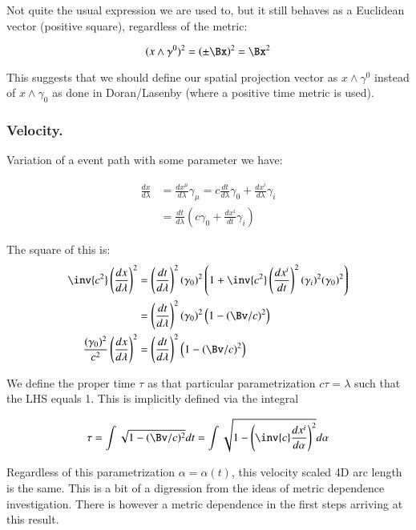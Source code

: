 Not quite the usual expression we are used to, but it still behaves as a Euclidean vector (positive square), regardless of the metric:

\begin{equation*}
(x \wedge \gamma^0)^2 = \left(\pm \Bx\right)^2 = \Bx^2
\end{equation*}

This suggests that we should define our spatial projection vector as $x \wedge \gamma^0$ instead of $x \wedge \gamma_0$ as done in
Doran/Lasenby (where a positive time metric is used).

\subsubsection{Velocity. }

Variation of a event path with some parameter we have:

\begin{align*}
\frac{ d x }{ d \lambda }
&= \frac{ d x^{\mu} }{ d \lambda } \gamma_{\mu} = c \frac{dt}{d\lambda} \gamma_0 + \frac{d x^i }{d\lambda} \gamma_i \\
&= \frac{d t}{d \lambda} \left( c \gamma_0 + \frac{d x^i }{dt} \gamma_i \right)
\end{align*}

The square of this is:
\begin{align*}
\inv{c^2} \left(\frac{ d x }{ d \lambda } \right)^2
&= \left(\frac{dt }{d\lambda}\right)^2 (\gamma_0)^2 \left( 1 + \inv{c^2}\left(\frac{d x^i }{dt}\right)^2 (\gamma_i)^2 (\gamma_0)^2 \right) \\
&= \left(\frac{d t}{d \lambda}\right)^2 (\gamma_0)^2 \left( 1 - (\Bv/c)^2 \right) \\
\frac{ (\gamma_0)^2 }{c^2} \left(\frac{ d x }{ d \lambda } \right)^2 &= \left(\frac{d t}{d \lambda}\right)^2 \left( 1 - (\Bv/c)^2 \right) \\
\end{align*}

We define the proper time $\tau$ as that particular parametrization $c \tau = \lambda$ such that the LHS equals 1.  This is implicitly defined
via the integral

\begin{equation*}
\tau = \int \sqrt{ 1 - (\Bv/c)^2 } dt = \int \sqrt{ 1 - \left(\inv{c} \frac{dx^i }{d \alpha} \right)^2 } d\alpha
\end{equation*}

Regardless of this parametrization $\alpha = \alpha(t)$, this velocity scaled 4D arc length is the same.  This is a bit of a digression from the
ideas of metric dependence investigation.  There is however a metric dependence in the first steps arriving at this result.

